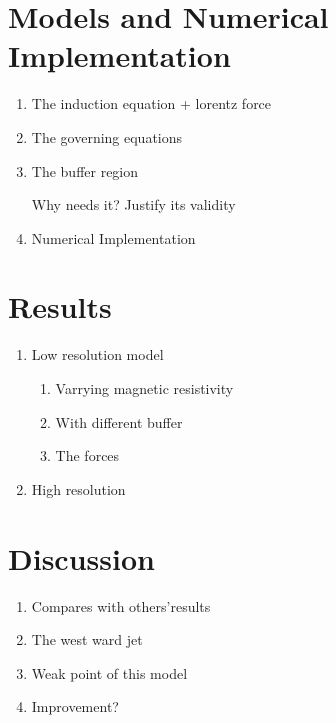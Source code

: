 \documentclass[11pt]{article}
\begin{document}
\section{Models and Numerical Implementation }
\begin{enumerate}
\item The induction equation + lorentz force 
\item The governing equations
\item The buffer region 

Why needs it? Justify its validity
\item Numerical Implementation 
\end{enumerate}

\section{Results}
\begin{enumerate}
\item Low resolution model
\begin{enumerate}
\item Varrying magnetic resistivity
\item With different buffer
\item The forces
\end{enumerate}
\item High resolution
\end{enumerate}

\section{Discussion}
\begin{enumerate}
\item Compares with others'results
\item The west ward jet 
\item Weak point of this model
\item Improvement?
\end{enumerate}
\end{document}
